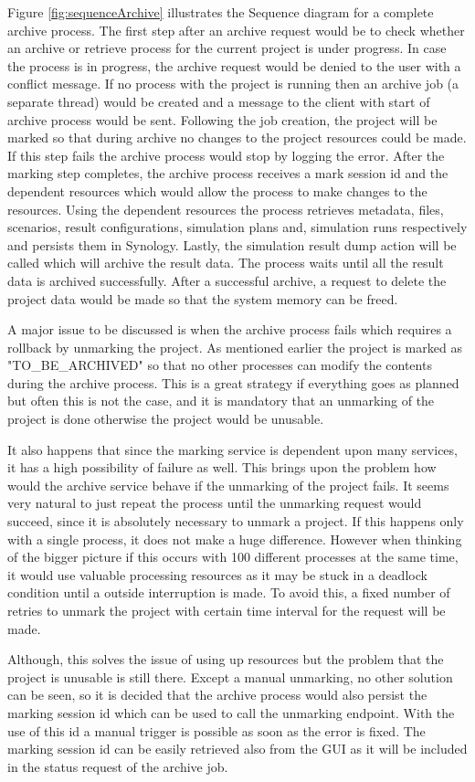 Figure \ref{fig:sequenceArchive} illustrates the Sequence diagram for a complete archive process. The first step after an archive request would be to check
whether an archive or retrieve process for the current project is under progress. In case the process is in progress, the archive request would be denied to the
user with a conflict message. If no process with the project is running then an archive job (a separate thread) would be created and a message to the client with start of archive process would be
sent. Following the job creation, the project will be marked so that during archive no changes to the project resources could be made. If this step fails the archive 
process would stop by logging the error. After the marking step completes, the archive process receives a mark session id and the dependent resources which would allow the process to make
changes to the resources. Using the dependent resources the process retrieves metadata, files, scenarios, result configurations, simulation plans and, simulation runs 
respectively and persists them in Synology. Lastly, the simulation result dump action will be called which will archive the result data. The process waits until
all the result data is archived successfully. After a successful archive, a request to delete the project data would be made so that the system memory can be freed.

A major issue to be discussed is when the archive process fails which requires a rollback by unmarking the project. As mentioned earlier the project is
marked as "TO\_BE\_ARCHIVED" so that no other processes can modify the contents during the archive process. This is a great strategy if everything goes as planned but 
often this is not the case, and it is mandatory that an unmarking of the project is done otherwise the project would be unusable. 

It also happens that since the
marking service is dependent upon many services, it has a high possibility of failure as well. This brings upon the problem how would the archive service behave if the
unmarking of the project fails. It seems very natural to just repeat the process until the unmarking request would succeed, since it is absolutely necessary to unmark
a project. If this happens only with a single process, it does not make a huge difference. However when thinking of the bigger picture if this 
occurs with 100 different processes at the same time, it would use valuable processing resources as it may be stuck in a deadlock condition until a outside interruption
is made. To avoid this, a fixed number of retries to unmark the project with certain time interval for the request 
will be made. 

Although, this solves the issue of using up resources but the problem that the project is unusable is still there. Except a manual unmarking, no other solution 
can be seen, so 
it is decided that the archive process would also persist the marking session id which can be used to call the unmarking endpoint. With the use of this id a manual 
trigger is possible as soon as the error is fixed. The marking session id can be easily retrieved also from the GUI as it will be included in the status request of
the archive job.
 